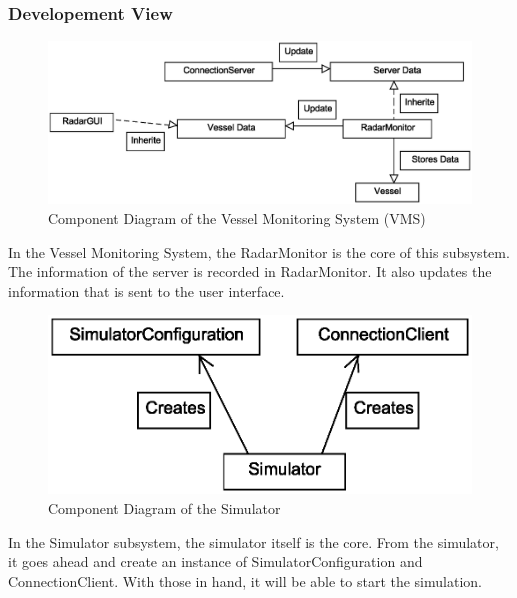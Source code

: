 \documentclass{article}
\begin{document}
\subsubsection{Developement View} %
\begin{figure}[!htb]
\caption{Component Diagram of the Vessel Monitoring System (VMS)}
\centering
\includegraphics[scale=0.4]{diagrams/vms-component-diagram.eps}
\end{figure}
In the Vessel Monitoring System, the RadarMonitor is the core of this subsystem.
The information of the server is recorded in RadarMonitor.
It also updates the information that is sent to the user interface.

\break

\begin{figure}[!htb]
\caption{Component Diagram of the Simulator}
\centering
\includegraphics[scale=0.4]{diagrams/simulator-component-diagram.eps}
\end{figure}
In the Simulator subsystem, the simulator itself is the core.
From the simulator, it goes ahead and create an instance of SimulatorConfiguration and ConnectionClient.
With those in hand, it will be able to start the simulation.
\end{document}
